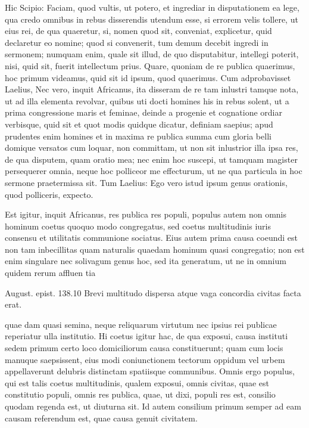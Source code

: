  Hic Scipio: Faciam, quod vultis, ut potero, et ingrediar in disputationem ea lege, qua credo omnibus in rebus disserendis utendum esse, si errorem velis tollere, ut eius rei, de qua quaeretur, si, nomen quod sit, conveniat, explicetur, quid declaretur eo nomine; quod si convenerit, tum demum decebit ingredi in sermonem; numquam enim, quale sit illud, de quo disputabitur, intellegi poterit, nisi, quid sit, fuerit intellectum prius. Quare, quoniam de re publica quaerimus, hoc primum videamus, quid sit id ipsum, quod quaerimus. Cum adprobavisset Laelius, Nec vero, inquit Africanus, ita disseram de re tam inlustri tamque nota, ut ad illa elementa revolvar, quibus uti docti homines his in rebus solent, ut a prima congressione maris et feminae, deinde a progenie et cognatione ordiar verbisque, quid sit et quot modis quidque dicatur, definiam saepius; apud prudentes enim homines et in maxima re publica summa cum gloria belli domique versatos cum loquar, non committam, ut non sit inlustrior illa ipsa res, de qua disputem, quam oratio mea; nec enim hoc suscepi, ut tamquam magister persequerer omnia, neque hoc polliceor me effecturum, ut ne qua particula in hoc sermone praetermissa sit. Tum Laelius: Ego vero istud ipsum genus orationis, quod polliceris, expecto.

 Est igitur, inquit Africanus, res publica res populi, populus autem non omnis hominum coetus quoquo modo congregatus, sed coetus multitudinis iuris consensu et utilitatis communione sociatus. Eius autem prima causa coeundi est non tam inbecillitas quam naturalis quaedam hominum quasi congregatio; non est enim singulare nec solivagum genus hoc, sed ita generatum, ut ne in omnium quidem rerum affluen tia

 August. epist. 138.10 Brevi multitudo dispersa atque vaga concordia civitas facta erat.

 quae dam quasi semina, neque reliquarum virtutum nec ipsius rei publicae reperiatur ulla institutio. Hi coetus igitur hac, de qua exposui, causa instituti sedem primum certo loco domiciliorum causa constituerunt; quam cum locis manuque saepsissent, eius modi coniunctionem tectorum oppidum vel urbem appellaverunt delubris distinctam spatiisque communibus. Omnis ergo populus, qui est talis coetus multitudinis, qualem exposui, omnis civitas, quae est constitutio populi, omnis res publica, quae, ut dixi, populi res est, consilio quodam regenda est, ut diuturna sit. Id autem consilium primum semper ad eam causam referendum est, quae causa genuit civitatem.

